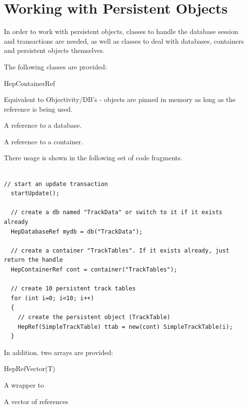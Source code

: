\section{Working with Persistent Objects}

\par

In order to work with persistent objects, classes to handle the database session and
transactions are needed, as well as classes to deal with databases, containers
and persistent objects themselves.

\par

The following classes are provided:\begin{DLtt}{HepContainerRef}
\item[HepRef]Equivalent to Objectivity/DB's  - objects are pinned 
in memory as long as the reference is being used.
\item[HepDatabaseRef]A reference to a database.
\item[HepContainerRef]A reference to a container.
\end{DLtt}

\par

There usage is shown in the following set of code fragments.
\begin{verbatim}

// start an update transaction 
  startUpdate(); 

  // create a db named "TrackData" or switch to it if it exists already 
  HepDatabaseRef mydb = db("TrackData"); 

  // create a container "TrackTables". If it exists already, just return the handle 
  HepContainerRef cont = container("TrackTables"); 

  // create 10 persistent track tables 
  for (int i=0; i<10; i++) 
  { 
    // create the persistent object (TrackTable) 
    HepRef(SimpleTrackTable) ttab = new(cont) SimpleTrackTable(i); 
  } 

\end{verbatim}

\par

In addition. two arrays are provided:
\begin{DLtt}{HepRefVector(T)}
\item[HepVector(T)]A wrapper to 
\item[HepRefVector(T)]A vector of references
\end{DLtt}

